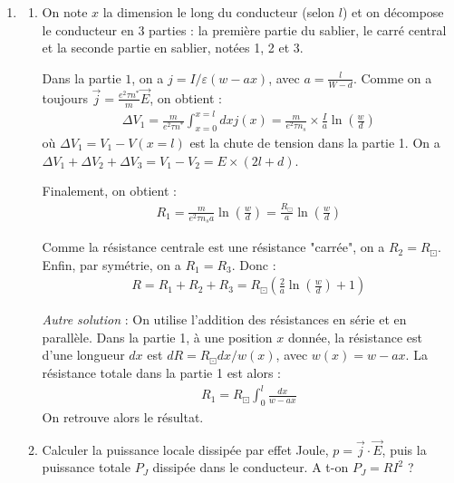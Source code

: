 \begin{correction}
\begin{enumerate}
\begin{enumerate}
\end{enumerate}

\item

\begin{enumerate}

	\item On note $x$ la dimension le long du conducteur (selon $l$) et on décompose le conducteur en 3 parties : la première partie du sablier, le carré central et la seconde partie en sablier, notées 1, 2 et 3.
	
	Dans la partie $1$, on a $j=I/\varepsilon(w-ax)$, avec $a=\frac{l}{W-d}$. Comme on a toujours $\vec{j}=\frac{e^2\tau n^*}{m}\vec{E}$, on obtient :
	\begin{align*}
		\Delta V_1=\frac{m}{e^2\tau n^*}\int_{x=0}^{x=l}dxj(x)=\frac{m}{e^2\tau n_s}\times\frac{I}{a}\ln\left(\frac{w}{d} \right) 
	\end{align*}
	où $\Delta V_1 = V_1-V(x=l)$ est la chute de tension dans la partie 1. On a $\Delta V_1+\Delta V_2+\Delta V_3=V_1-V_2 = E\times (2l+d) $.
	
	Finalement, on obtient :
	\begin{align*}
		R_1=\frac{m}{e^2\tau n_sa}\ln\left(\frac{w}{d} \right) =\frac{R_\boxdot}{a}\ln\left(\frac{w}{d} \right)
	\end{align*}
	
	Comme la résistance centrale est une résistance "carrée", on a $R_2=R_\boxdot$. Enfin, par symétrie, on a $R_1=R_3$. Donc :
	\begin{align*}
		R = R_1+R_2+R_3 = R_\boxdot\left(\frac{2}{a}\ln\left(\frac{w}{d} \right)+1 \right) 
	\end{align*}
	
	\textit{Autre solution} : On utilise l'addition des résistances en série et en parallèle. Dans la partie 1, à une position $x$ donnée, la résistance est d'une longueur $dx$ est $dR=R_\boxdot dx/w(x)$, avec $w(x)=w-ax$. La résistance totale dans la partie 1 est alors :
	\begin{align*}
		R_1=R_\boxdot\int_0^l \frac{dx}{w-ax}
	\end{align*}
	On retrouve alors le résultat. 
	
	\item Calculer la puissance locale dissipée par effet Joule, $p=\vec{j}\cdot\vec{E}$, puis la puissance totale $P_J$ dissipée dans le conducteur. A t-on $P_J=RI^2$ ?

\end{enumerate}

\end{enumerate}

\end{correction}

